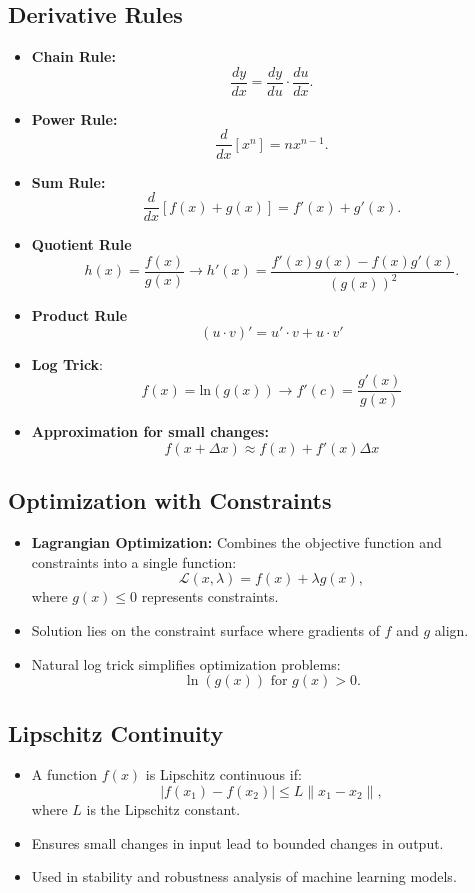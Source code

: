 \documentclass[12pt,a4paper]{article}
\begin{document}
\subsection{Derivative Rules}
\begin{itemize}
    \item \textbf{Chain Rule:}
    \[ \frac{dy}{dx} = \frac{dy}{du} \cdot \frac{du}{dx}. \]
    \item \textbf{Power Rule:}
    \[ \frac{d}{dx}[x^n] = n x^{n-1}. \]
    \item \textbf{Sum Rule:}
    \[ \frac{d}{dx}[f(x) + g(x)] = f'(x) + g'(x). \]
    \item \textbf{Quotient Rule} 
\[{\displaystyle h(x)={\frac {f(x)}{g(x)}}} \rightarrow {\displaystyle h'(x)={\frac {f'(x)g(x)-f(x)g'(x)}{(g(x))^{2}}}.}\]
\item \textbf{Product Rule} \[{\displaystyle (u\cdot v)'=u'\cdot v+u\cdot v'}\]
    \item \textbf{Log Trick}: \[f(x) = \text{ln}(g(x)) \rightarrow f'(c) = \frac{g'(x)}{g(x)}\]
    \item \textbf{Approximation for small changes:}
    \[f(x+\Delta x) \approx f(x) + f'(x)\Delta x\]
\end{itemize}
\subsection{Optimization with Constraints}
\begin{itemize}
    \item \textbf{Lagrangian Optimization:} Combines the objective function and constraints into a single function:
    \[ \mathcal{L}(x, \lambda) = f(x) + \lambda g(x), \]
    where $g(x) \leq 0$ represents constraints.
    \item Solution lies on the constraint surface where gradients of $f$ and $g$ align.
    \item Natural log trick simplifies optimization problems:
    \[ \ln(g(x)) \text{ for } g(x) > 0. \]
\end{itemize}

\subsection{Lipschitz Continuity}
\begin{itemize}
    \item A function $f(x)$ is Lipschitz continuous if:
    \[ |f(x_1) - f(x_2)| \leq L \|x_1 - x_2\|, \]
    where $L$ is the Lipschitz constant.
    \item Ensures small changes in input lead to bounded changes in output.
    \item Used in stability and robustness analysis of machine learning models.
\end{itemize}
\end{document}
